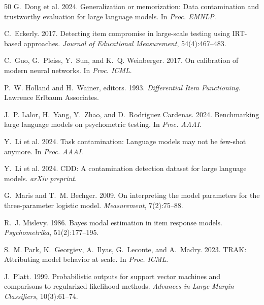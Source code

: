 \documentclass[11pt,a4paper]{article}
\begin{document}
\begin{thebibliography}{50}
G.~Dong et al. 2024.
\newblock Generalization or memorization: Data contamination and trustworthy evaluation for large language models.
\newblock In \emph{Proc. EMNLP}.

C.~Eckerly. 2017.
\newblock Detecting item compromise in large-scale testing using IRT-based approaches.
\newblock \emph{Journal of Educational Measurement}, 54(4):467--483.

C.~Guo, G.~Pleiss, Y.~Sun, and K.~Q. Weinberger. 2017.
\newblock On calibration of modern neural networks.
\newblock In \emph{Proc. ICML}.

P.~W. Holland and H.~Wainer, editors. 1993.
\newblock \emph{Differential Item Functioning}.
\newblock Lawrence Erlbaum Associates.

J.~P. Lalor, H.~Yang, Y.~Zhao, and D.~Rodriguez Cardenas. 2024.
\newblock Benchmarking large language models on psychometric testing.
\newblock In \emph{Proc. AAAI}.

Y.~Li et al. 2024.
\newblock Task contamination: Language models may not be few-shot anymore.
\newblock In \emph{Proc. AAAI}.

Y.~Li et al. 2024.
\newblock CDD: A contamination detection dataset for large language models.
\newblock \emph{arXiv preprint}.

G.~Maris and T.~M. Bechger. 2009.
\newblock On interpreting the model parameters for the three-parameter logistic model.
\newblock \emph{Measurement}, 7(2):75--88.

R.~J. Mislevy. 1986.
\newblock Bayes modal estimation in item response models.
\newblock \emph{Psychometrika}, 51(2):177--195.

S.~M. Park, K.~Georgiev, A.~Ilyas, G.~Leconte, and A.~Madry. 2023.
\newblock TRAK: Attributing model behavior at scale.
\newblock In \emph{Proc. ICML}.

J.~Platt. 1999.
\newblock Probabilistic outputs for support vector machines and comparisons to regularized likelihood methods.
\newblock \emph{Advances in Large Margin Classifiers}, 10(3):61--74.


\end{thebibliography}
\end{document}
